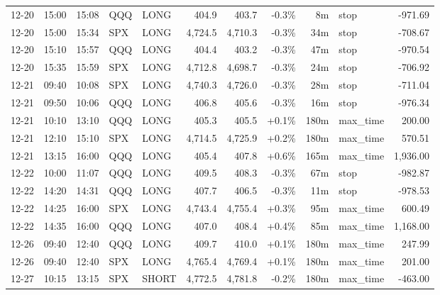 \documentclass[11pt,a4paper,twoside]{article}
\begin{document}
\begin{center}
\begin{longtable}{>{\color{txtmain}}l l l l l r r r r >{\color{txtmain}}l r}
12-20 & 15:00 & 15:08 & QQQ & LONG & 404.9 & 403.7 & \textcolor{lossred}{-0.3\%} & 8m & stop & \textcolor{lossred}{-971.69} \\
12-20 & 15:00 & 15:34 & SPX & LONG & 4,724.5 & 4,710.3 & \textcolor{lossred}{-0.3\%} & 34m & stop & \textcolor{lossred}{-708.67} \\
12-20 & 15:10 & 15:57 & QQQ & LONG & 404.4 & 403.2 & \textcolor{lossred}{-0.3\%} & 47m & stop & \textcolor{lossred}{-970.54} \\
12-20 & 15:35 & 15:59 & SPX & LONG & 4,712.8 & 4,698.7 & \textcolor{lossred}{-0.3\%} & 24m & stop & \textcolor{lossred}{-706.92} \\
12-21 & 09:40 & 10:08 & SPX & LONG & 4,740.3 & 4,726.0 & \textcolor{lossred}{-0.3\%} & 28m & stop & \textcolor{lossred}{-711.04} \\
12-21 & 09:50 & 10:06 & QQQ & LONG & 406.8 & 405.6 & \textcolor{lossred}{-0.3\%} & 16m & stop & \textcolor{lossred}{-976.34} \\
12-21 & 10:10 & 13:10 & QQQ & LONG & 405.3 & 405.5 & \textcolor{wingreen}{+0.1\%} & 180m & max\_time & \textcolor{wingreen}{200.00} \\
12-21 & 12:10 & 15:10 & SPX & LONG & 4,714.5 & 4,725.9 & \textcolor{wingreen}{+0.2\%} & 180m & max\_time & \textcolor{wingreen}{570.51} \\
12-21 & 13:15 & 16:00 & QQQ & LONG & 405.4 & 407.8 & \textcolor{wingreen}{+0.6\%} & 165m & max\_time & \textcolor{wingreen}{1,936.00} \\
12-22 & 10:00 & 11:07 & QQQ & LONG & 409.5 & 408.3 & \textcolor{lossred}{-0.3\%} & 67m & stop & \textcolor{lossred}{-982.87} \\
12-22 & 14:20 & 14:31 & QQQ & LONG & 407.7 & 406.5 & \textcolor{lossred}{-0.3\%} & 11m & stop & \textcolor{lossred}{-978.53} \\
12-22 & 14:25 & 16:00 & SPX & LONG & 4,743.4 & 4,755.4 & \textcolor{wingreen}{+0.3\%} & 95m & max\_time & \textcolor{wingreen}{600.49} \\
12-22 & 14:35 & 16:00 & QQQ & LONG & 407.0 & 408.4 & \textcolor{wingreen}{+0.4\%} & 85m & max\_time & \textcolor{wingreen}{1,168.00} \\
12-26 & 09:40 & 12:40 & QQQ & LONG & 409.7 & 410.0 & \textcolor{wingreen}{+0.1\%} & 180m & max\_time & \textcolor{wingreen}{247.99} \\
12-26 & 09:40 & 12:40 & SPX & LONG & 4,765.4 & 4,769.4 & \textcolor{wingreen}{+0.1\%} & 180m & max\_time & \textcolor{wingreen}{201.00} \\
12-27 & 10:15 & 13:15 & SPX & SHORT & 4,772.5 & 4,781.8 & \textcolor{lossred}{-0.2\%} & 180m & max\_time & \textcolor{lossred}{-463.00} \\

\end{longtable}
\end{center}
\end{document}

